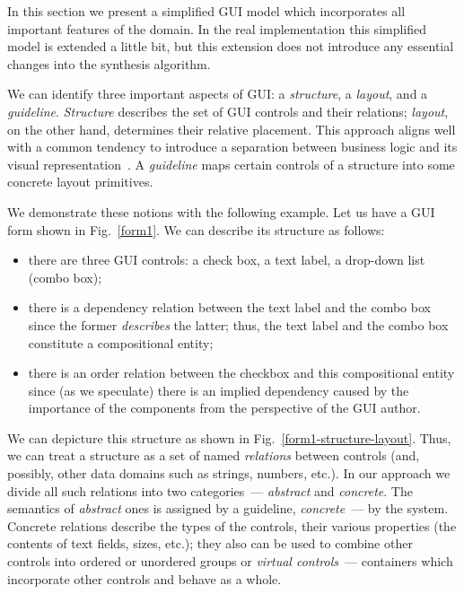 
In this section we present a simplified GUI model which incorporates all important features of the
domain. In the real implementation this simplified model is extended a little bit, but this extension
does not introduce any essential changes into the synthesis algorithm.

We can identify three important aspects of GUI: a \emph{structure}, a \emph{layout}, and a \emph{guideline}.
\emph{Structure} describes the set of GUI controls and their relations; \emph{layout}, on the other hand, determines
their relative placement. This approach aligns well with a common tendency to introduce a separation between business
logic and its visual representation~\cite{UI3}. A \emph{guideline} maps certain controls of a structure into some concrete
layout primitives.

We demonstrate these notions with the following example. Let us have a GUI form shown in Fig.~\ref{form1}. We can describe its structure as follows:

\begin{itemize}
\item there are three GUI controls: a check box, a text label, a drop-down list (combo box);
\item there is a dependency relation between the text label and the combo box since the former \emph{describes} the
  latter; thus, the text label and the combo box constitute a compositional entity;
\item there is an order relation between the checkbox and this compositional entity
  since (as we speculate) there is an implied dependency caused by the importance of the components
  from the perspective of the GUI author.
\end{itemize}

We can depicture this structure as shown in Fig.~\ref{form1-structure-layout}.
Thus, we can treat a structure as a set of named \emph{relations} between controls (and, possibly, other
data domains such as strings, numbers, etc.). In our approach we divide all such relations into two categories~---
\emph{abstract} and \emph{concrete}. The semantics of \emph{abstract} ones is assigned by a guideline, \emph{concrete}~---
by the system. Concrete relations describe the types of the controls, their various properties (the contents of
text fields, sizes, etc.); they also can be used to combine other controls into ordered or unordered groups or
\emph{virtual controls}~--- containers which incorporate other controls and behave as a whole.

